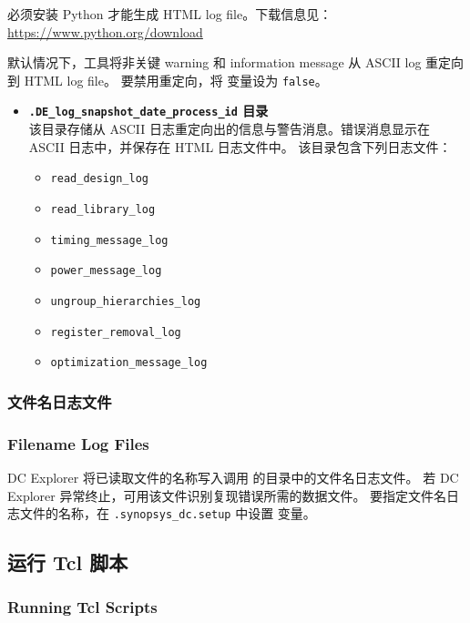 \begin{noteBox}
必须安装 Python 才能生成 HTML log file。下载信息见：\url{https://www.python.org/download}

默认情况下，工具将非关键 warning 和 information message 从 ASCII log 重定向到 HTML log file。
要禁用重定向，将  变量设为 \texttt{false}。
\end{noteBox}

\begin{itemize}
  \item \textbf{\texttt{.DE\_log\_snapshot\_date\_process\_id} 目录}\\
        该目录存储从 ASCII 日志重定向出的信息与警告消息。错误消息显示在 ASCII 日志中，并保存在 HTML 日志文件中。
        该目录包含下列日志文件：
        \begin{itemize}
          \item \texttt{read\_design\_log}
          \item \texttt{read\_library\_log}
          \item \texttt{timing\_message\_log}
          \item \texttt{power\_message\_log}
          \item \texttt{ungroup\_hierarchies\_log}
          \item \texttt{register\_removal\_log}
          \item \texttt{optimization\_message\_log}
        \end{itemize}
\end{itemize}

\subsubsection{文件名日志文件}
\subsubsection*{Filename Log Files}

DC Explorer 将已读取文件的名称写入调用  的目录中的文件名日志文件。
若 DC Explorer 异常终止，可用该文件识别复现错误所需的数据文件。
要指定文件名日志文件的名称，在 \texttt{.synopsys\_dc.setup} 中设置  变量。

\subsection{运行 Tcl 脚本}
\subsubsection*{Running Tcl Scripts}

